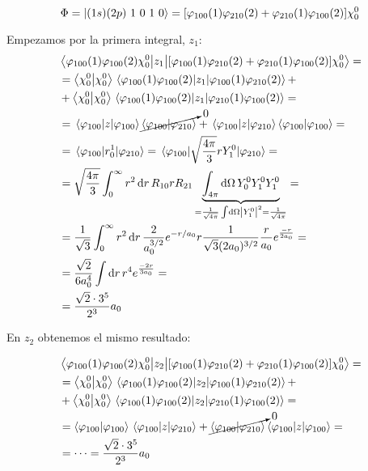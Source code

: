 \begin{equation}
  \Phi = \ket{(1s)(2p)\ 1\ 0\ 1\ 0} = [\varphi_{100}(1)\varphi_{210}(2)
   + \varphi_{210}(1)\varphi_{100}(2)]
  \chi_0^0
\end{equation}

Empezamos por la primera integral, $z_1$:
  \begin{equation}
    \begin{split}
      &\mel{\varphi_{100}(1)\varphi_{100}(2)\chi_0^0}{z_1}{[\varphi_{100}(1)\varphi_{210}(2)
        + \varphi_{210}(1)\varphi_{100}(2)] \chi_0^0
      } = \\
      &= \ip{\chi_0^0}
      \mel{\varphi_{100}(1)\varphi_{100}(2)}{z_1}{\varphi_{100}(1)\varphi_{210}(2)}
      + \\
      &+\ip{\chi_0^0}
      \mel{\varphi_{100}(1)\varphi_{100}(2)}{z_1}{\varphi_{210}(1)\varphi_{100}(2)}
      = \\
      &= 
      \mel{\varphi_{100}}{z}{\varphi_{100}}\cancelto{0}{\braket{\varphi_{100}}{\varphi_{210}}}
      +\mel{\varphi_{100}}{z}{\varphi_{210}}\braket{\varphi_{100}}{\varphi_{100}}
      = \\
      &= \mel{\varphi_{100}}{r_0^1}{\varphi_{210}} =
      \mel{\varphi_{100}}{\sqrt{\frac{4\pi}{3}}rY_1^0}{\varphi_{210}}
      = \\
      &= \sqrt{\frac{4\pi}{3}}\int_0^\infty r^2 \dd{r} R_{10} r R_{21}
      \underbrace{\int_{4\pi}  \dd{\Omega} Y_0^0 Y_1^0
        Y_1^0}_{=\frac{1}{\sqrt{4\pi}}\int \dd{\Omega} \abs{Y_1^0}^2 =
        \frac{1}{\sqrt{4\pi}}} = \\
      &= \frac{1}{\sqrt{3}} \int_0^\infty r^2 \dd{r}
      \frac{2}{a_0^{3/2}} e^{-r/a_0} r \frac{1}{\sqrt{3}(2a_0)^{3/2}}
      \frac{r}{a_0} e^{\frac{-r}{2a_0}} = \\
      &= \frac{\sqrt{2}}{6a_0^4} \int \dd{r} r^4 e^{\frac{-2r}{3a_0}}
      = \\
      &= \frac{\sqrt{2}\cdot3^5}{2^3} a_0
    \end{split}
  \end{equation}

  En $z_2$ obtenemos el mismo resultado:

  \begin{equation}
    \begin{split}
      &\mel{\varphi_{100}(1)\varphi_{100}(2)\chi_0^0}{z_2}{[\varphi_{100}(1)\varphi_{210}(2)
        + \varphi_{210}(1)\varphi_{100}(2)] \chi_0^0
      } = \\
      &= \ip{\chi_0^0}
      \mel{\varphi_{100}(1)\varphi_{100}(2)}{z_2}{\varphi_{100}(1)\varphi_{210}(2)}
      + \\
      &+ \ip{\chi_0^0}
      \mel{\varphi_{100}(1)\varphi_{100}(2)}{z_2}{\varphi_{210}(1)\varphi_{100}(2)}
      = \\
      &= 
      \braket{\varphi_{100}}{\varphi_{100}}\mel{\varphi_{100}}{z}{\varphi_{210}}
      +\cancelto{0}{\braket{\varphi_{100}}{\varphi_{210}}}\mel{\varphi_{100}}{z}{\varphi_{100}}
      = \\
      &= \cdots = \frac{\sqrt{2}\cdot3^5}{2^3} a_0
    \end{split}
  \end{equation}


